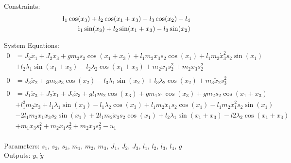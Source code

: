 \documentclass[10pt,a4paper]{article}
\begin{document}
	\noindent Constraints:			
	\begin{subequations}
	\begin{align}
		\l_1\cos(x_3) + l_2\cos(x_1 + x_3) - l_3\cos(x_2) - l_4 \\
		\l_1\sin(x_3) + l_2\sin(x_1 + x_3) - l_3\sin(x_2)
	\end{align}
	\end{subequations}
	
	\noindent System Equations:			
	\begin{subequations}
	\begin{align*}
	0 &= J_2\ddot{x}_1 + J_2\ddot{x}_3 + g m_2 s_2\cos(x_1 + x_3) + l_1 m_2 \ddot{x}_3 s_2 \cos(x_1) + l_1 m_2 \dot{x}_3^2 s_2 \sin(x_1) \\
	&+ l_2 \lambda_1 \sin(x_1 + x_3) - l_2 \lambda_2 \cos(x_1 + x_3) + m_2 \ddot{x}_1 s_2^2 + m_2 \ddot{x}_3 s_2^2 \\ 
	\\
	0 &= J_3 \ddot{x}_2 + g m_3 s_3 \cos(x_2) - l_3 \lambda_1 \sin(x_2) + l_3 \lambda_2 \cos(x_2) + m_3 \ddot{x}_2 s_3^2 \\
	\\
	0 &= J_1 \ddot{x}_3 + J_2 \ddot{x}_1 + J_2 \ddot{x}_3 + g l_1 m_2 \cos(x_3) + g m_1 s_1 \cos(x_3) + g m_2 s_2 \cos(x_1 + x_3) \\
	&+ l_1^2 m_2 \ddot{x}_3 + l_1 \lambda_1 \sin(x_3) - l_1 \lambda_2 \cos(x_3) + l_1 m_2 \ddot{x}_1 s_2 \cos(x_1)- l_1 m_2 \dot{x}_1^2 s_2 \sin(x_1) \\
	&- 2 l_1 m_2 \dot{x}_1 \dot{x}_3 s_2 \sin(x_1) + 2 l_1 m_2 \ddot{x}_3 s_2 \cos(x_1)+ l_2 \lambda_1 \sin(x_1 + x_3) - l2 \lambda_2 \cos(x_1 + x_3) \\
	&+ m_1 \ddot{x}_3 s_1^2 + m_2 \ddot{x}_1 s_2^2 + m_2 \ddot{x}_3 s_2^2 - u_1 \\
	\end{align*}       
	\end{subequations}

	\noindent
	Parameters: $s_1, \, s_2, \, s_3, \, m_1, \, m_2, \, m_3, \, J_1, \, J_2, \, J_3, \, l_1, \, l_2, \, l_3, \, l_4, \, g$%
	\\
	Outputs: $y, \, \dot{y}$ %
	
	
	
	
\end{document}
